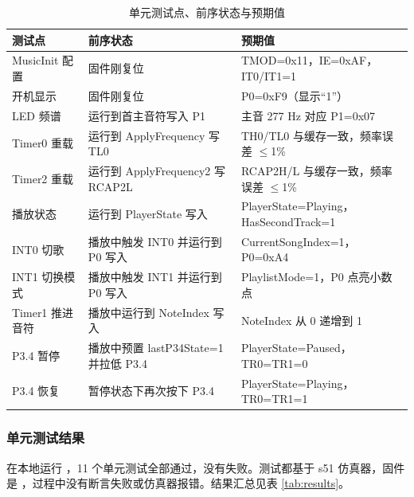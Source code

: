 \documentclass[zihao=-4,a4paper]{ctexart}
\begin{document}
\begin{table}[H]
    \centering
    \caption{单元测试点、前序状态与预期值}
    \label{tab:tests}
    \small
    \begin{tabular}{>{\raggedright\arraybackslash}p{2.6cm}>{\raggedright\arraybackslash}p{4.2cm}>{\raggedright\arraybackslash}p{5.2cm}}
    \toprule
    测试点 & 前序状态 & 预期值 \\
    \midrule
    MusicInit 配置 & 固件刚复位 & TMOD=0x11，IE=0xAF，IT0/IT1=1 \\
    开机显示 & 固件刚复位 & P0=0xF9（显示“1”） \\
    LED 频谱 & 运行到首主音符写入 P1 & 主音 277 Hz 对应 P1=0x07 \\
    Timer0 重载 & 运行到 ApplyFrequency 写 TL0 & TH0/TL0 与缓存一致，频率误差 $\leq$1\% \\
    Timer2 重载 & 运行到 ApplyFrequency2 写 RCAP2L & RCAP2H/L 与缓存一致，频率误差 $\leq$1\% \\
    播放状态 & 运行到 PlayerState 写入 & PlayerState=Playing，HasSecondTrack=1 \\
    INT0 切歌 & 播放中触发 INT0 并运行到 P0 写入 & CurrentSongIndex=1，P0=0xA4 \\
    INT1 切换模式 & 播放中触发 INT1 并运行到 P0 写入 & PlaylistMode=1，P0 点亮小数点 \\
    Timer1 推进音符 & 播放中运行到 NoteIndex 写入 & NoteIndex 从 0 递增到 1 \\
    P3.4 暂停 & 播放中预置 lastP34State=1 并拉低 P3.4 & PlayerState=Paused，TR0=TR1=0 \\
    P3.4 恢复 & 暂停状态下再次按下 P3.4 & PlayerState=Playing，TR0=TR1=1 \\
    \bottomrule
    \end{tabular}
\end{table}

\subsubsection*{单元测试结果}

在本地运行 ，11 个单元测试全部通过，没有失败。测试都基于 s51 仿真器，固件是 ，过程中没有断言失败或仿真器报错。结果汇总见表 \ref{tab:results}。
\end{document}
